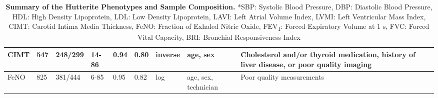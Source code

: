 \begin{landscape}
\begin{table}
\begin{adjustbox}{width={\textwidth}}
\begin{tabular}{@{}p{2.5cm}|p{1cm}p{2cm}p{2cm}p{1cm}p{1cm}p{4cm}p{3cm}p{5cm}@{}}
CIMT & 547 & 248/299 & 	14-86 & 	0.94 & 	0.80 & 	inverse & 	age, sex	 & Cholesterol and/or thyroid medication, history of liver disease, or poor quality imaging \\ \hline
FeNO & 825 & 381/444 & 	6-85 & 	0.95 & 	0.82 & 	log & 	age, sex, technician	 & Poor quality measurements  \\ \bottomrule
\end{tabular}
\end{adjustbox}
\caption[Summary of the Hutterite Phenotypes and Sample Composition. ]{\textbf{Summary of the Hutterite Phenotypes and Sample Composition.} *SBP: Systolic Blood Pressure, DBP: Diastolic Blood Pressure, HDL: High Density Lipoprotein, LDL: Low Density Lipoprotein, LAVI: Left Atrial Volume Index, LVMI: Left Ventricular Mass Index, CIMT: Carotid Intima Media Thickness, FeNO: Fraction of Exhaled Nitric Oxide, FEV\textsubscript{1}: Forced Expiratory Volume at 1 s, FVC: Forced Vital Capacity, BRI: Bronchial Responsiveness Index}
\label{tab:tab-s1a}
\end{table}



\end{landscape}

